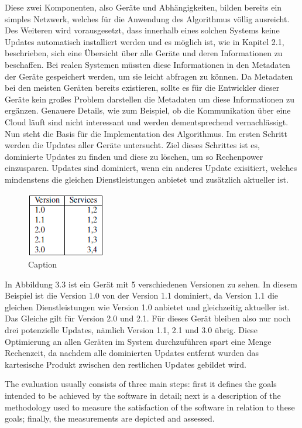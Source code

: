 Diese zwei Komponenten, also Geräte und Abhängigkeiten, bilden bereits ein simples Netzwerk, welches für die Anwendung 
des Algorithmus völlig ausreicht. Des Weiteren wird vorausgesetzt, dass innerhalb eines solchen Systems keine Updates automatisch
installiert werden und es möglich ist, wie in Kapitel 2.1, beschrieben, sich eine Übersicht über alle Geräte und deren Informationen zu
beschaffen. Bei realen Systemen müssten diese Informationen in den Metadaten der Geräte
gespeichert werden, um sie leicht abfragen zu können. Da Metadaten bei den meisten
Geräten bereits existieren, sollte es für die Entwickler dieser Geräte kein großes Problem darstellen die Metadaten
um diese Informationen zu ergänzen. Genauere Details, wie zum Beispiel, ob die Kommunikation über eine Cloud läuft sind nicht
interessant und werden dementsprechend vernachlässigt.
Nun steht die Basis für die Implementation des Algorithmus. Im ersten Schritt werden die Updates aller Geräte untersucht. 
Ziel dieses Schrittes ist es, dominierte Updates zu finden und diese zu löschen, um so Rechenpower einzusparen. Updates sind dominiert,
wenn ein anderes Update exisitiert, welches mindenstens die gleichen Dienstleistungen anbietet und zusätzlich aktueller ist.

\begin{figure}[h]
\begin{center}
\includegraphics{"Versions"}
\caption{Caption}
\label{fig:Prob1:MEA}
\end{center}
\end{figure}

\FloatBarrier

In Abbildung 3.3 ist ein Gerät mit 5 verschiedenen Versionen zu sehen. In diesem Beispiel ist die Version 1.0 von der Version 1.1 dominiert,
da Version 1.1 die gleichen Dienstleistungen wie Version 1.0 anbietet und gleichzeitig aktueller ist. Das Gleiche gilt für Version 2.0 und 2.1.
Für dieses Gerät bleiben also nur noch drei potenzielle Updates, nämlich Version 1.1, 2.1 und 3.0 übrig. Diese Optimierung an allen Geräten
im System durchzuführen spart eine Menge Rechenzeit, da nachdem alle dominierten Updates entfernt wurden das kartesische Produkt
zwischen den restlichen Updates gebildet wird. 














The evaluation usually consists of three main steps:
first it defines the goals intended to be achieved by the software in detail;
next is a description of the methodology
used to measure the satisfaction of the software in relation to these goals;
finally, the measurements are depicted and assessed.


